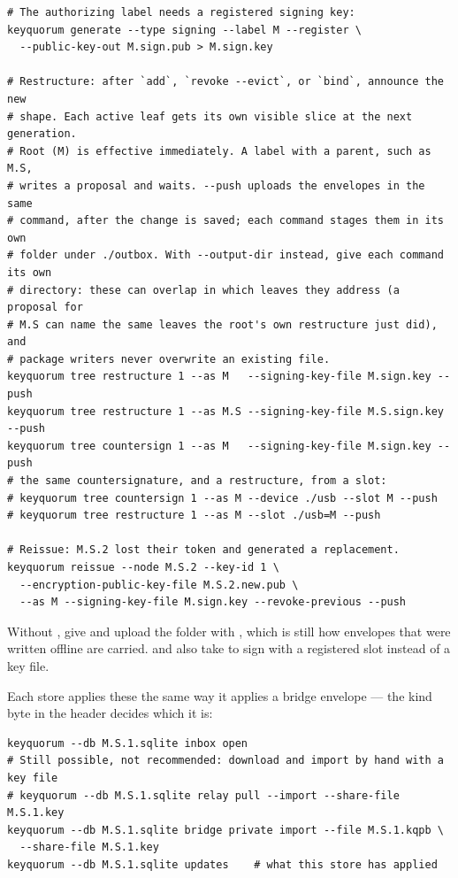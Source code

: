 \begin{lstlisting}
# The authorizing label needs a registered signing key:
keyquorum generate --type signing --label M --register \
  --public-key-out M.sign.pub > M.sign.key

# Restructure: after `add`, `revoke --evict`, or `bind`, announce the new
# shape. Each active leaf gets its own visible slice at the next generation.
# Root (M) is effective immediately. A label with a parent, such as M.S,
# writes a proposal and waits. --push uploads the envelopes in the same
# command, after the change is saved; each command stages them in its own
# folder under ./outbox. With --output-dir instead, give each command its own
# directory: these can overlap in which leaves they address (a proposal for
# M.S can name the same leaves the root's own restructure just did), and
# package writers never overwrite an existing file.
keyquorum tree restructure 1 --as M   --signing-key-file M.sign.key --push
keyquorum tree restructure 1 --as M.S --signing-key-file M.S.sign.key --push
keyquorum tree countersign 1 --as M   --signing-key-file M.sign.key --push
# the same countersignature, and a restructure, from a slot:
# keyquorum tree countersign 1 --as M --device ./usb --slot M --push
# keyquorum tree restructure 1 --as M --slot ./usb=M --push

# Reissue: M.S.2 lost their token and generated a replacement.
keyquorum reissue --node M.S.2 --key-id 1 \
  --encryption-public-key-file M.S.2.new.pub \
  --as M --signing-key-file M.sign.key --revoke-previous --push
\end{lstlisting}

\noindent Without \flag{--push}, give \flag{--output-dir} and upload the
folder with , which is still how envelopes that were
written offline are carried.  and  also
take \flag{--slot} to sign with a registered slot instead of a key file.

Each store applies these the same way it applies a bridge envelope --- the
kind byte in the header decides which it is:

\begin{lstlisting}
keyquorum --db M.S.1.sqlite inbox open
# Still possible, not recommended: download and import by hand with a key file
# keyquorum --db M.S.1.sqlite relay pull --import --share-file M.S.1.key
keyquorum --db M.S.1.sqlite bridge private import --file M.S.1.kqpb \
  --share-file M.S.1.key
keyquorum --db M.S.1.sqlite updates    # what this store has applied
\end{lstlisting}

